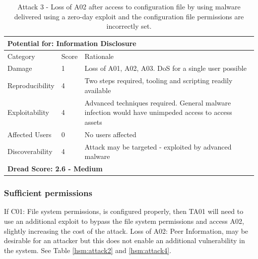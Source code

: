 \documentclass [11pt, proquest] {uwthesis}[2020/02/24]
\begin{document}
\begin{table}[H]
\begin{tabular}{|m{3cm}|m{1cm}|p{27em} |}
\multicolumn{3}{l}{Potential for: Information Disclosure}  \\
\hline
Category & Score & Rationale \\
\hline
Damage          & 1     & Loss of A01, A02, A03. DoS for a single user possible \\
\hline
Reproducibility & 4     & Two steps required, tooling and scripting readily available    \\
\hline
Exploitability & 4      & Advanced techniques required. General malware infection would have unimpeded access to access assets  \\
\hline
Affected Users  & 0     & No users affected  \\
\hline
Discoverability & 4     & Attack may be targeted - exploited by advanced malware \\
\hline
\multicolumn{3}{l}{\textbf{Dread Score: 2.6 - Medium}} 
\end{tabular}
\caption{Attack 3 - Loss of A02 after access to configuration file by using malware delivered using a zero-day exploit and the configuration file permissions are incorrectly set.}
\label{hsm:attack3}
\end{table}

\subsubsection{Sufficient permissions}
If C01: File system permissions, is configured properly, then TA01 will need to use an additional exploit to bypass the file system permissions and access A02, slightly increasing the cost of the attack. Loss of A02: Peer Information, may be desirable for an attacker but this does not enable an additional vulnerability in the system.
See Table \ref{hsm:attack2} and \ref{hsm:attack4}.
\end{document}
